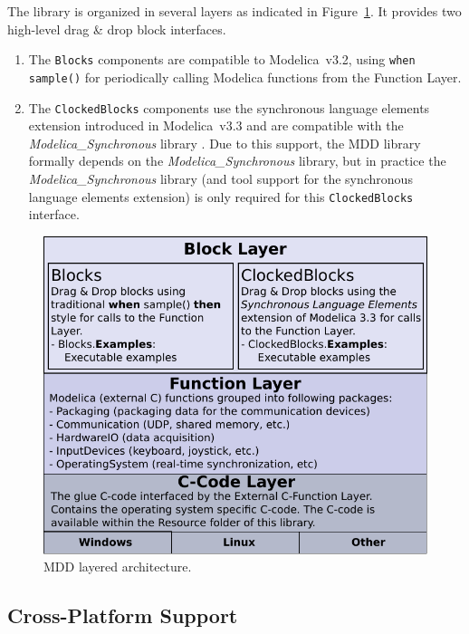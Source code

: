 \documentclass{resources/modelica}
\newcommand{\modelica}[1]{\lstinline[language=modelica]|#1|}
\begin{document}
The library is organized in several layers as indicated in
Figure~\ref{fig:MDDLayeredArchitecture}. It
provides two high-level drag \& drop block interfaces.
\begin{enumerate}
 \item The \modelica{Blocks} components are
compatible to Modelica~v3.2, using \modelica{when sample()}
for periodically calling Modelica functions from the \textsf{Function Layer}.
 \item The \modelica{ClockedBlocks} components use the synchronous language elements extension
introduced in Modelica~v3.3 and are compatible with the
\emph{Modelica\_Synchronous} library \citep{Otter2012}. Due to this support, the
MDD library formally depends on the \emph{Modelica\_Synchronous} library, but in
practice the \emph{Modelica\_Synchronous} library (and tool support for the
synchronous language elements extension) is only required for this \modelica{ClockedBlocks} interface.
\end{enumerate}
\begin{figure}[htb]
\begin{center}
  \includegraphics[width=\columnwidth]{figures/MDDLayeredArchitecture}
  \caption{MDD layered architecture.}
  \label{fig:MDDLayeredArchitecture}
\end{center}
\end{figure}

\subsection{Cross-Platform Support}
\label{sec:CrossPlatformSupport}
\end{document}
